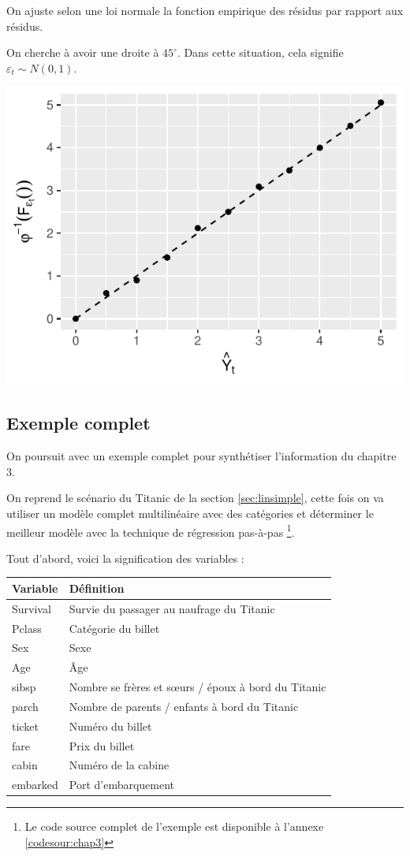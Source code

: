 \documentclass[11pt,french]{report}
\begin{document}
On ajuste selon une loi normale la fonction empirique des résidus par rapport aux résidus. \newline

On cherche à avoir une droite à $45^\circ$. Dans cette situation, cela signifie $\varepsilon_t \sim N(0,1)$.

\includegraphics{notes_de_cours-034}

\subsection{Exemple complet}
\label{ex:chapitre3}

On poursuit avec un exemple complet pour synthétiser l'information du chapitre 3. \newline

On reprend le scénario du Titanic de la section \ref{sec:linsimple}, cette fois on va utiliser un modèle complet multilinéaire avec des catégories et déterminer le meilleur modèle avec la technique de régression pas-à-pas \footnote{Le code source complet de l'exemple est disponible à l'annexe \ref{codesour:chap3}}.  \newline

Tout d'abord, voici la signification des variables :
\begin{center}
\begin{tabularx}{\textwidth}{XX}
\hline
Variable & Définition \\
\hline
Survival & Survie du passager au naufrage du Titanic \\
Pclass & Catégorie du billet \\
Sex & Sexe \\
Age & Âge \\
sibsp & Nombre se frères et sœurs / époux à bord du Titanic \\
parch & Nombre de parents / enfants à bord du Titanic \\
ticket & Numéro du billet \\
fare & Prix du billet \\
cabin & Numéro de la cabine \\
embarked & Port d'embarquement \\
\hline
\end{tabularx}
\end{center}
\end{document}
